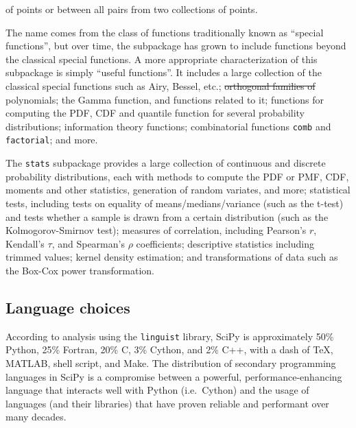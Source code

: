 \documentclass[fleqn,10pt]{wlscirep}
\providecommand{\DIFadd}[1]{{\protect\color{blue}\uwave{#1}}} %
\providecommand{\DIFdel}[1]{{\protect\color{red}\sout{#1}}}                      %
\providecommand{\DIFaddbegin}{} %
\providecommand{\DIFaddend}{} %
\providecommand{\DIFdelbegin}{} %
\providecommand{\DIFdelend}{} %
\begin{document}
\begin{description}[leftmargin=!, labelwidth=\widthof{\bfseries \texttt{interpolate}}]
    of points or between all pairs from two collections of points.
\item[\texttt{special}]
    The name comes from the class of functions traditionally known as ``special
    functions'', but over time, the subpackage has grown to include functions
    beyond the classical special functions.  A more appropriate characterization
    of this subpackage is simply ``useful functions''.
    It includes a large collection of the classical special functions
    such as Airy, Bessel, etc.; \DIFdelbegin \DIFdel{orthogonal families of }\DIFdelend \DIFaddbegin \DIFadd{families of orthogonal }\DIFaddend polynomials;
    the Gamma function, and functions related to it;
    functions for computing the PDF, CDF and quantile function for several
    probability distributions;
    information theory functions;
    combinatorial functions \texttt{comb} and \texttt{factorial};
    and more.
\item[\texttt{stats}]
    The \texttt{stats} subpackage provides a large collection of continuous
    and discrete probability distributions, each with methods to compute
    the PDF or PMF, CDF, moments and other statistics, generation of random
    variates, and more;
    statistical tests, including tests on equality of means/medians/variance
    (such as the t-test) and tests whether a sample is drawn from a
    certain distribution (such as the Kolmogorov-Smirnov test);
    measures of correlation, including Pearson's $r$, Kendall's $\tau$, and
    Spearman's $\rho$ coefficients;
    descriptive statistics including trimmed values;
    kernel density estimation;
    and transformations of data such as the Box-Cox power transformation.
\end{description}

\subsection*{Language choices}

According to analysis using the \texttt{linguist} library\cite{linguistref}, SciPy is approximately 50\% Python, 25\% Fortran, 20\% C, 3\% Cython, and 2\% C++, with a dash of \TeX, MATLAB, shell script, and Make. The distribution of secondary programming languages in SciPy is a compromise between a powerful, performance-enhancing language that interacts well with Python (i.e.\ Cython) and the usage of languages (and their libraries) that have proven reliable and performant over many decades.
\end{document}
